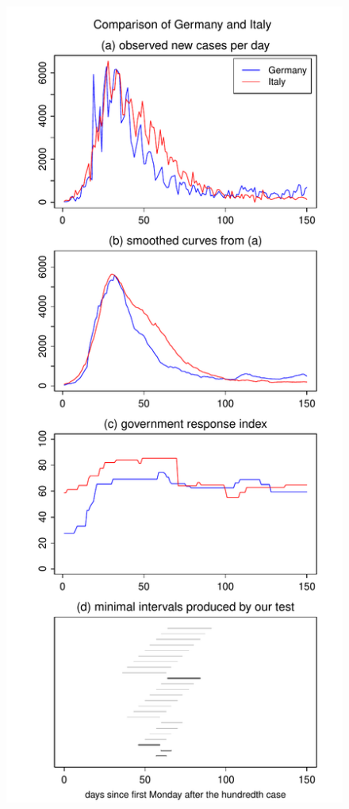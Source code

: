 \documentclass[a4paper,12pt]{article}
\numberwithin{equation}{section}
\begin{document}
\begin{figure}[p!]
\begin{minipage}[t]{0.49\textwidth}
\includegraphics[width=\textwidth]{plots/DEU_vs_ITA_Monday}

\end{minipage}
\end{figure}
\end{document}
